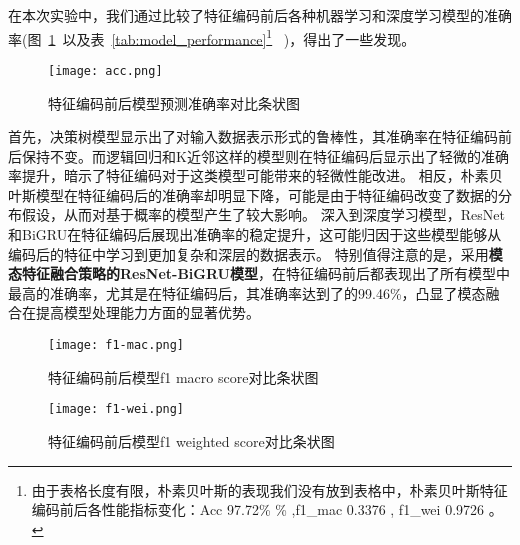   在本次实验中，我们通过比较了特征编码前后各种机器学习和深度学习模型的准确率(图~\ref{fig:comapre_accuracy_encoding}~以及表~\ref{tab:model_performance}\footnote{由于表格长度有限，朴素贝叶斯的表现我们没有放到表格中，朴素贝叶斯特征编码前后各性能指标变化：Acc 97.72\% \% ,f1\_mac 0.3376 , f1\_wei 0.9726 。}
  ~)，得出了一些发现。
  \begin{figure}[htbp]
    \centering
    \texttt{[image: acc.png]}
    \caption{特征编码前后模型预测准确率对比条状图}
    \label{fig:comapre_accuracy_encoding}
    \end{figure}
    首先，决策树模型显示出了对输入数据表示形式的鲁棒性，其准确率在特征编码前后保持不变。而逻辑回归和K近邻这样的模型则在特征编码后显示出了轻微的准确率提升，暗示了特征编码对于这类模型可能带来的轻微性能改进。
  相反，朴素贝叶斯模型在特征编码后的准确率却明显下降，可能是由于特征编码改变了数据的分布假设，从而对基于概率的模型产生了较大影响。
  深入到深度学习模型，ResNet和BiGRU在特征编码后展现出准确率的稳定提升，这可能归因于这些模型能够从编码后的特征中学习到更加复杂和深层的数据表示。
  特别值得注意的是，采用\textbf{模态特征融合策略的ResNet-BiGRU模型}，在特征编码前后都表现出了所有模型中最高的准确率，尤其是在特征编码后，其准确率达到了的99.46\%，凸显了模态融合在提高模型处理能力方面的显著优势。\par
  \begin{figure}[htbp]
    \centering
    \texttt{[image: f1-mac.png]}
    \caption{特征编码前后模型f1 macro score对比条状图}
    \label{fig:f1_macro_score}
    \end{figure}
  \begin{figure}[htbp]
    \centering
    \texttt{[image: f1-wei.png]}
    \caption{特征编码前后模型f1 weighted score对比条状图}
    \label{fig:f1_weighted_score}
\end{figure}

